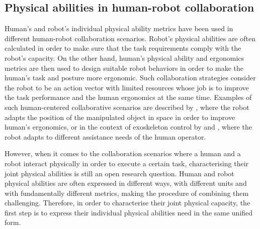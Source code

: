 
\subsection{Physical abilities in human-robot collaboration}

Human's and robot's individual physical ability metrics have been used in different human-robot collaboration scenarios. Robot's physical abilities are often calculated in order to make sure that the task requirements comply with the robot's capacity. On the other hand, human's physical ability and ergonomics metrics are then used to design suitable robot behaviors in order to make the human's task and posture more ergonomic. Such collaboration strategies consider the robot to be an action vector with limited resources whose job is to improve the task performance and the human ergonomics at the same time. Examples of such human-centered collaborative scenarios are described by \citet{KIM2021102084}, where the robot adapts the position of the manipulated object in space in order to improve human's ergonomics, or in the context of exoskeleton control by \citet{carmichael2013admittance,carmichael_towards_2011} and \citet{petric2019assistive}, where the robot adapts to different assistance needs of the human operator.

However, when it comes to the collaboration scenarios where a human and a robot interact physically in order to execute a certain task, characterising their joint physical abilities is still an open research question. Human and robot physical abilities are often expressed in different ways, with different units and with fundamentally different metrics, making the procedure of combining them challenging. Therefore, in order to characterise their joint physical capacity, the first step is to express their individual physical abilities need in the same unified form. 

